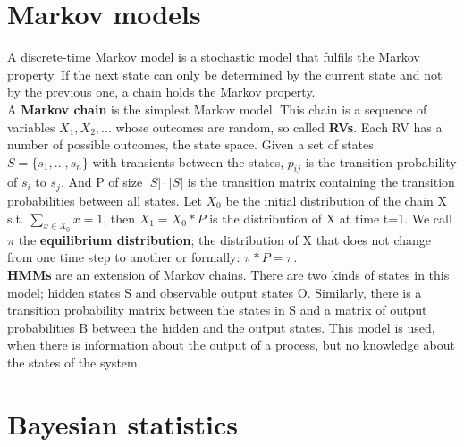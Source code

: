 \section{Markov models} 
\label{section:MM}
A discrete-time Markov model is a stochastic model that fulfils the Markov property. If the next state can only be determined by the current state and not by the previous one, a chain holds the Markov property.\\

A \textbf{Markov chain} is the simplest Markov model. This chain is a sequence of variables $X_1, X_2, ...$ whose outcomes are random, so called \textbf{\acp{RV}}. Each \ac{RV} has a number of possible outcomes, the state space. Given a set of states $S = \{s_1, ..., s_n\}$ with transients between the states, $p_{ij}$ is the transition probability of $s_i$ to $s_j$. And P of size $|S|\cdot|S|$ is the transition matrix containing the transition probabilities between all states.\newline
Let $X_0$ be the initial distribution of the chain X s.t. $\sum_{x \in X_0}{x} = 1$, then $X_1 = X_0 * P$ is the distribution of X at time t=1. We call $\pi$ the \textbf{equilibrium distribution}; the distribution of X that does not change from one time step to another or formally: $\pi * P = \pi$.\\
\textbf{\acp{HMM}} are an extension of Markov chains. There are two kinds of states in this model; hidden states S and observable output states O. Similarly, there is a transition probability matrix between the states in S and a matrix of output probabilities B between the hidden and the output states.\newline
This model is used, when there is information about the output of a process, but no knowledge about the states of the system.\\

\section{Bayesian statistics} 
\label{section:Baystat}

